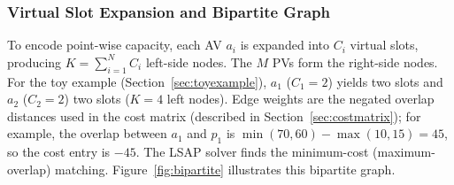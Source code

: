 \documentclass[conference]{IEEEtran}
\begin{document}
\subsubsection{Virtual Slot Expansion and Bipartite Graph}

To encode point-wise capacity, each AV $a_i$ is expanded into $C_i$ virtual slots, producing $K = \sum_{i=1}^{N} C_i$ left-side nodes. The $M$ PVs form the right-side nodes. For the toy example (Section~\ref{sec:toyexample}), $a_1$ ($C_1\!=\!2$) yields two slots and $a_2$ ($C_2\!=\!2$) two slots ($K\!=\!4$ left nodes). Edge weights are the negated overlap distances used in the cost matrix (described in Section~\ref{sec:costmatrix}); for example, the overlap between $a_1$ and $p_1$ is $\min(70,60)-\max(10,15)=45$, so the cost entry is $-45$. The LSAP solver finds the minimum-cost (maximum-overlap) matching. Figure~\ref{fig:bipartite} illustrates this bipartite graph.
\end{document}
